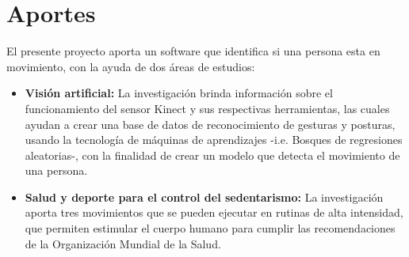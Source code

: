 \section{Aportes}
El presente proyecto aporta un software que identifica si una persona esta en movimiento, con la ayuda de dos \'areas de estudios:
\begin{itemize}
	\item \textbf{Visi\'on artificial:} La investigaci\'on brinda informaci\'on sobre el funcionamiento del sensor Kinect y sus respectivas herramientas, las cuales ayudan a crear una base de datos de reconocimiento de gesturas y posturas, usando la tecnolog\'ia de m\'aquinas de aprendizajes -i.e. Bosques de regresiones aleatorias-, con la finalidad de crear un modelo que detecta el movimiento de una persona.
	\item \textbf{Salud y deporte para el control del sedentarismo:} La investigaci\'on aporta tres movimientos que se pueden ejecutar en rutinas de alta intensidad, que permiten estimular el cuerpo humano para cumplir las recomendaciones de la Organizaci\'on Mundial de la Salud.
\end{itemize}